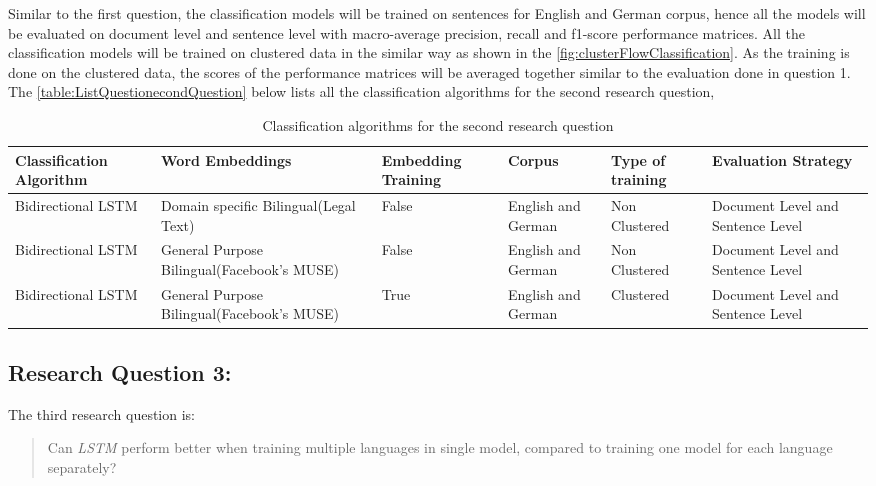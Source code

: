 Similar to the first question, the classification models will be trained on sentences for English and German corpus, hence all the models will be evaluated on document level and sentence level with macro-average precision, recall and f1-score performance matrices. All the classification models will be trained on clustered data in the similar way as shown in the  \ref{fig:clusterFlowClassification}. As the training is done on the clustered data, the scores of the performance matrices will be averaged together similar to the evaluation done in question 1.
\clearpage
The \ref{table:ListQuestionecondQuestion} below lists all the classification algorithms for the second research question,
\begin{table}[!ht]
\begin{tabular}{>{\centering\arraybackslash}m{2cm}>{\centering\arraybackslash}m{2.9cm}>{\centering\arraybackslash}m{1.8cm}>{\centering\arraybackslash}m{2cm}>{\centering\arraybackslash}m{1.9cm}>{\centering\arraybackslash}m{2cm}}
\hline
\textbf{Classification Algorithm} & \textbf{Word Embeddings} & \textbf{Embedding Training} & \textbf{Corpus} & \textbf{Type of training} & \textbf{Evaluation Strategy} \\ \hline
Bidirectional LSTM & Domain specific Bilingual(Legal Text) & False & English and German & Non Clustered & Document Level and Sentence Level \\
Bidirectional LSTM & General Purpose Bilingual(Facebook's MUSE) & False & English and German & Non Clustered & Document Level and Sentence Level \\
Bidirectional LSTM & General Purpose Bilingual(Facebook's MUSE) & True & English and German & Clustered & Document Level and Sentence Level \\ \hline
\end{tabular}
\caption{Classification algorithms for the second research question}
\label{table:ListQuestionSecondQuestion}
\end{table}

\subsection{Research Question 3:} \label{question3}

The third research question is:

\begin{quote}
    Can \textit{LSTM} perform better when training multiple languages in single model, compared to training one model for each language separately?
\end{quote}

